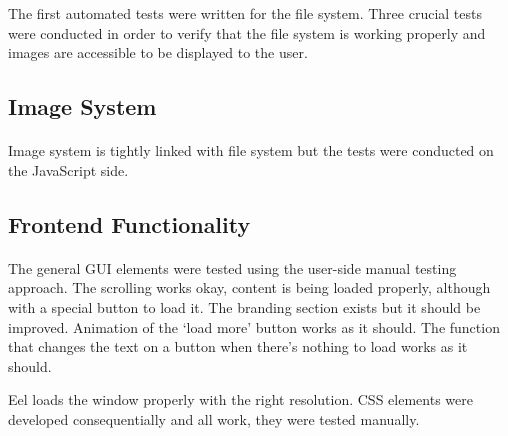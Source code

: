 \documentclass[12pt]{report}
\begin{document}
    The first automated tests were written for the file system. Three crucial tests were conducted in order to verify that the file system is working properly and images are accessible to be displayed to the user.

    \subsection*{Image System}
    \paragraph{}

    Image system is tightly linked with file system but the tests were conducted on the JavaScript side.


    \subsection*{Frontend Functionality}
    \paragraph{}


    The general GUI elements were tested using the user-side manual testing approach. The scrolling works okay, content is being loaded properly, although with a special button to load it. The branding section exists but it should be improved. Animation of the `load more' button works as it should.
    The function that changes the text on a button when there's nothing to load works as it should.

    Eel loads the window properly with the right resolution. CSS elements were developed consequentially and all work, they were tested manually.

    \clearpage
\end{document}
